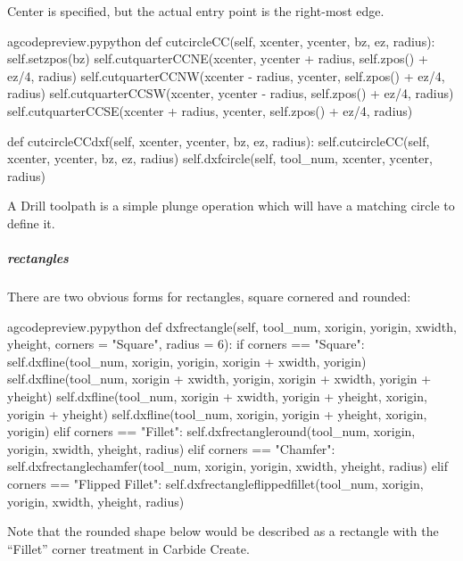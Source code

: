 \documentclass{ltxdoc}
\begin{document}
Center is specified, but the actual entry point is the right-most edge.

\lstset{firstnumber=\thegcpy}
\begin{writecode}{a}{gcodepreview.py}{python}
    def cutcircleCC(self, xcenter, ycenter, bz, ez, radius):
        self.setzpos(bz)
        self.cutquarterCCNE(xcenter, ycenter + radius, self.zpos() + ez/4, radius) 
        self.cutquarterCCNW(xcenter - radius, ycenter, self.zpos() + ez/4, radius) 
        self.cutquarterCCSW(xcenter, ycenter - radius, self.zpos() + ez/4, radius) 
        self.cutquarterCCSE(xcenter + radius, ycenter, self.zpos() + ez/4, radius) 

    def cutcircleCCdxf(self, xcenter, ycenter, bz, ez, radius):
        self.cutcircleCC(self, xcenter, ycenter, bz, ez, radius)
        self.dxfcircle(self, tool_num, xcenter, ycenter, radius)

\end{writecode}
\addtocounter{gcpy}{11}

A Drill toolpath is a simple plunge operation which will have a matching circle to define it.

\subparagraph{rectangles}

There are two obvious forms for rectangles, square cornered and rounded:

\lstset{firstnumber=\thegcpy}
\begin{writecode}{a}{gcodepreview.py}{python}
    def dxfrectangle(self, tool_num, xorigin, yorigin, xwidth, yheight, corners = "Square", radius = 6):
        if corners == "Square":
            self.dxfline(tool_num, xorigin, yorigin, xorigin + xwidth, yorigin)
            self.dxfline(tool_num, xorigin + xwidth, yorigin, xorigin + xwidth, yorigin + yheight)
            self.dxfline(tool_num, xorigin + xwidth, yorigin + yheight, xorigin, yorigin + yheight)
            self.dxfline(tool_num, xorigin, yorigin + yheight, xorigin, yorigin)
        elif corners == "Fillet":
            self.dxfrectangleround(tool_num, xorigin, yorigin, xwidth, yheight, radius)
        elif corners == "Chamfer":
            self.dxfrectanglechamfer(tool_num, xorigin, yorigin, xwidth, yheight, radius)
        elif corners == "Flipped Fillet":
            self.dxfrectangleflippedfillet(tool_num, xorigin, yorigin, xwidth, yheight, radius)

\end{writecode}
\addtocounter{gcpy}{13}

Note that the rounded shape below would be described as a rectangle with the ``Fillet'' corner treatment in Carbide Create.
\end{document}
